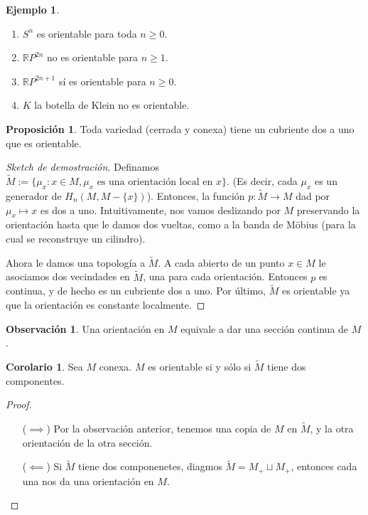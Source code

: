 \documentclass[spanish]{book}
\theoremstyle{definition}
\newtheorem*{obs}{Observación}
\newtheorem*{prop}{Proposición}
\newtheorem*{coro}{Corolario}
\newtheorem*{ejem}{Ejemplo}
\newcommand{\R}{\mathbb{R}}
\begin{document}
\begin{ejem}\leavevmode
	\begin{enumerate}
		\item $S^n$ es orientable para toda $n\geq0$.
		\item $\R P^{2n}$ no es orientable para $n\geq1$.
		\item $\R P^{2n+1}$ sí es orientable para $n\geq0$.
		\item $K$ la botella de Klein no es orientable.
	\end{enumerate}
\end{ejem}

\begin{prop}
	Toda variedad (cerrada y conexa) tiene un cubriente dos a uno que es orientable.
\end{prop}
\begin{proof}[Sketch de demostración]
	Definamos $\tilde{M}:=\{\mu_x:x\in M, \mu_x\text{ es una orientación local en }x\}$. (Es decir, cada $\mu_x$ es un generador de $H_n(M,M-\{x\})$). Entonces, la función $p:\tilde{M}\to M$ dad por $\mu_x\mapsto x$ es dos a uno. Intuitivamente, nos vamos deslizando por $M$ preservando la orientación hasta que le damos dos vueltas, como a la banda de Möbius (para la cual se reconstruye un cilindro).
	
	Ahora le damos una topología a $\tilde{M}$. A cada abierto de un punto $x\in M$ le asociamos dos vecindades en $\tilde{M}$, una para cada orientación. Entonces $p$ es continua, y de hecho es un cubriente dos a uno. Por último, $\tilde{M}$ es orientable ya que la orientación es constante localmente.
\end{proof}

\begin{obs}
	Una orientación en $M$ equivale a dar una sección continua de $M$.
\end{obs}

\begin{coro}
	Sea $M$ conexa. $M$ es orientable si y sólo si $\tilde{M}$ tiene dos componentes.
\end{coro}
\begin{proof}\leavevmode
	\begin{enumerate}
		\item [($\implies$)] Por la observación anterior, tenemos una copia de $M$ en $\tilde{M}$, y la otra orientación de la otra sección.
		\item [($\impliedby$)] Si $\tilde{M}$ tiene dos componenetes, diagmos $\tilde{M}=M_+\sqcup M_+$, entonces cada una nos da una orientación en $M$.
	\end{enumerate}
\end{proof}
\end{document}
